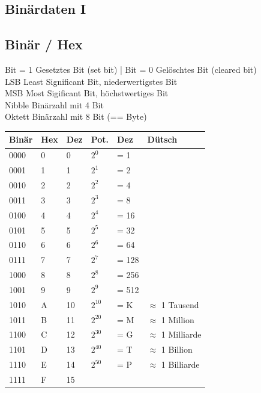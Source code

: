 \documentclass[8pt,landscape,a4paper]{scrartcl}
\begin{document}


	\begin{multicols*}{5}
		\setlength{\columnseprule}{0.3pt}
		\footnotesize
	\section{Binärdaten I}
	\subsection{Binär / Hex}
		Bit = 1 Gesetztes Bit (set bit) | Bit = 0 Gelöschtes Bit (cleared bit) \\
		\textcolor{b}{LSB} Least Significant Bit, niederwertigstes Bit\\
		\textcolor{b}{MSB} Most Sigificant Bit, höchstwertiges Bit\\
		\textcolor{b}{Nibble} Binärzahl mit 4 Bit\\
		\textcolor{b}{Oktett} Binärzahl mit 8 Bit (\textcolor{b}{== Byte})

	\begin{center}
		\vspace{-8pt}
	\begin{tabular}{|p{0.3cm} p{0.1cm} p{0.3cm} | p{0.2cm} p{0.7cm} p{1.5cm}|}
		\hline
		Binär&Hex&Dez&Pot.& Dez & Dütsch\\
		\hline
		\hline
		0000 & 0 & 0&$2^0$ & = 1 & \\
		0001 & 1 & 1&$2^1$ & = 2 & \\
		0010 & 2 & 2&$2^2$ & = 4 & \\
		0011 & 3 & 3&$2^3$ & = 8 & \\
		0100 & 4 & 4&$2^4$ & = 16 & \\
		0101 & 5 & 5&$2^5$ & = 32 & \\
		0110 & 6 & 6&$2^6$ & = 64 & \\
		0111 & 7 & 7&$2^7$ & = 128 & \\
		1000 & 8 & 8&$2^8$ & = 256 & \\
		1001 & 9 & 9&$2^9$ & = 512 & \\
		1010 & A & 10&$2^{10}$ & = K & $\approx$ 1 Tausend \\
		1011 & B & 11&$2^{20}$ & = M &$\approx$ 1 Million \\
		1100 & C & 12&$2^{30}$ & = G  &$\approx$ 1 Milliarde\\ 
		1101 & D & 13&$2^{40}$ & = T &$\approx$ 1 Billion\\
		1110 & E & 14&$2^{50}$ & = P &$\approx$ 1 Billiarde\\
		1111 & F & 15&&&\\
		\hline
	\end{tabular}
	\end{center}


\end{multicols*}
\end{document}
